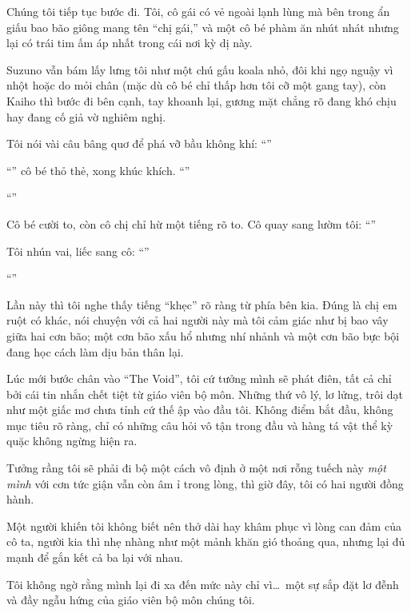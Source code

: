 \documentclass[../main.tex]{subfiles}
\begin{document}

Chúng tôi tiếp tục bước đi. Tôi, cô gái có vẻ ngoài lạnh lùng mà bên trong ẩn giấu bao bão giông mang tên ``chị gái,'' và một cô bé phàm ăn nhút nhát nhưng lại có trái tim ấm áp nhất trong cái nơi kỳ dị này.

Suzuno vẫn bám lấy lưng tôi như một chú gấu koala nhỏ, đôi khi ngọ nguậy vì nhột hoặc do mỏi chân (mặc dù cô bé chỉ thấp hơn tôi cỡ một gang tay), còn Kaiho thì bước đi bên cạnh, tay khoanh lại, gương mặt chẳng rõ đang khó chịu hay đang cố giả vờ nghiêm nghị.

Tôi nói vài câu bâng quơ để phá vỡ bầu không khí: ``''

``'' cô bé thỏ thẻ, xong khúc khích. ``''

``''

Cô bé cười to, còn cô chị chỉ hừ một tiếng rõ to. Cô quay sang lườm tôi: ``''

Tôi nhún vai, liếc sang cô: ``''

``''

Lần này thì tôi nghe thấy tiếng ``khẹc'' rõ ràng từ phía bên kia. Đúng là chị em ruột có khác, nói chuyện với cả hai người này mà tôi cảm giác như bị bao vây giữa hai cơn bão; một cơn bão xấu hổ nhưng nhí nhảnh và một cơn bão bực bội đang học cách làm dịu bản thân lại.

Lúc mới bước chân vào ``The Void'', tôi cứ tưởng mình sẽ phát điên, tất cả chỉ bởi cái tin nhắn chết tiệt từ giáo viên bộ môn. Những thứ vô lý, lơ lửng, trôi dạt như một giấc mơ chưa tỉnh cứ thế ập vào đầu tôi. Không điểm bắt đầu, không mục tiêu rõ ràng, chỉ có những câu hỏi vô tận trong đầu và hàng tá vật thể kỳ quặc không ngừng hiện ra.

Tưởng rầng tôi sẽ phải đi bộ một cách vô định ở một nơi rỗng tuếch này \emph{một mình} với cơn tức giận vẫn còn âm ỉ trong lòng, thì giờ đây, tôi có hai người đồng hành.

Một người khiến tôi không biết nên thở dài hay khâm phục vì lòng can đảm của cô ta, người kia thì nhẹ nhàng như một mảnh khăn gió thoảng qua, nhưng lại đủ mạnh để gắn kết cả ba lại với nhau.

Tôi không ngờ rằng mình lại đi xa đến mức này chỉ vì\dots\ một sự sắp đặt lơ đễnh và đầy ngẫu hứng của giáo viên bộ môn chúng tôi.
\end{document}
